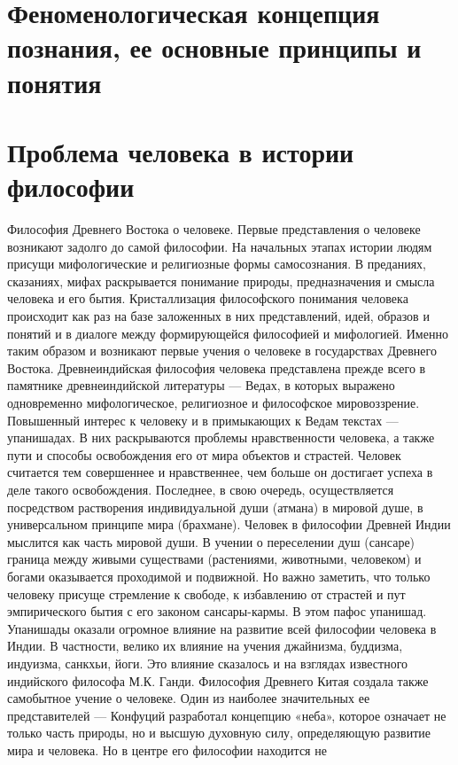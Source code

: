 \documentclass[12pt]{article}
\begin{document}
\newpage
\section{Феноменологическая концепция познания, ее основные принципы и понятия}


\newpage
\section{Проблема человека в истории философии}
Философия Древнего Востока о человеке.
Первые представления о человеке возникают задолго до самой философии. На начальных этапах истории
людям присущи мифологические и религиозные формы самосознания. В преданиях, сказаниях, мифах
раскрывается понимание природы, предназначения и смысла человека и его бытия. Кристаллизация
философского понимания человека происходит как раз на базе заложенных в них представлений, идей, образов
и понятий и в диалоге между формирующейся философией и мифологией. Именно таким образом и возникают
первые учения о человеке в государствах Древнего Востока.
Древнеиндийская философия человека представлена прежде всего в памятнике древнеиндийской литературы —
Ведах, в которых выражено одновременно мифологическое, религиозное и философское мировоззрение.
Повышенный интерес к человеку и в примыкающих к Ведам текстах — упанишадах. В них раскрываются
проблемы нравственности человека, а также пути и способы освобождения его от мира объектов и страстей.
Человек считается тем совершеннее и нравственнее, чем больше он достигает успеха в деле такого 
освобождения. Последнее, в свою очередь, осуществляется посредством растворения индивидуальной души
(атмана) в мировой душе, в универсальном принципе мира (брахмане).
Человек в философии Древней Индии мыслится как часть мировой души. В учении о переселении душ
(сансаре) граница между живыми существами (растениями, животными, человеком) и богами оказывается
проходимой и подвижной. Но важно заметить, что только человеку присуще стремление к свободе, к
избавлению от страстей и пут эмпирического бытия с его законом сансары-кармы. В этом пафос упанишад.
Упанишады оказали огромное влияние на развитие всей философии человека в Индии. В частности, велико их
влияние на учения джайнизма, буддизма, индуизма, санкхьи, йоги. Это влияние сказалось и на взглядах
известного индийского философа М.К. Ганди.
Философия Древнего Китая создала также самобытное учение о человеке. Один из наиболее значительных ее
представителей — Конфуций разработал концепцию «неба», которое означает не только часть природы, но и
высшую духовную силу, определяющую развитие мира и человека. Но в центре его философии находится не
\end{document}
